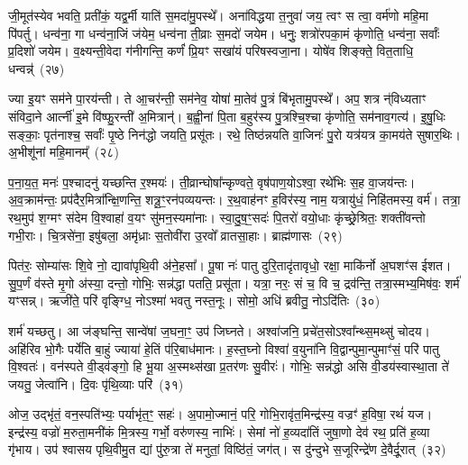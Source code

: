 {\anuvakamend[{अ॒गा॒ꣳ स॒ह॒स्रा॒क्ष॒ दे॒वाः॒ स॒हस्र॑धारा॒मत्यꣳ॑हा॒ अनु॑वर्त्मानः॒ षोड॑श च}]}%

जी॒मूत॑स्येव भवति॒ प्रती॑कं॒ यद्व॒र्मी याति॑ स॒मदा॑मु॒पस्थे᳚। अना॑विद्धया त॒नुवा॑ जय॒ त्वꣳ स त्वा॒ वर्म॑णो महि॒मा पि॑पर्तु। धन्व॑ना॒ गा धन्व॑ना॒जिं ज॑येम॒ धन्व॑ना ती॒व्राः स॒मदो॑ जयेम। धनुः॒ शत्रो॑रपका॒मं कृ॑णोति॒ धन्व॑ना॒ सर्वाः᳚ प्र॒दिशो॑ जयेम। व॒क्ष्यन्ती॒वेदा ग॑नीगन्ति॒ कर्णं॑ प्रि॒यꣳ सखा॑यं परिषस्वजा॒ना। योषे॑व शिङ्क्ते॒ वित॒ताधि॒ धन्वन्न्॑~(२७)

ज्या इ॒यꣳ सम॑ने पा॒रय॑न्ती। ते आ॒चर॑न्ती॒ सम॑नेव॒ योषा॑ मा॒तेव॑ पु॒त्रं बि॑भृतामु॒पस्थे᳚। अप॒ शत्र न्॑विध्यताꣳ संविदा॒ने आर्त्नी॑ इ॒मे वि॑ष्फु॒रन्ती॑ अ॒मित्रान्॑। ब॒ह्वी॒नां पि॒ता ब॒हुर॑स्य पु॒त्रश्चि॒श्चा कृ॑णोति॒ सम॑नाव॒गत्य॑। इ॒षु॒धिः सङ्काः॒ पृत॑नाश्च॒ सर्वाः᳚ पृ॒ष्ठे निन॑द्धो जयति॒ प्रसू॑तः। रथे॒ तिष्ठ॑न्नयति वा॒जिनः॑ पु॒रो यत्र॑यत्र का॒मय॑ते सुषार॒थिः। अ॒भीशू॑नां महि॒मानम्᳚~(२८)

प॒ना॒य॒त॒ मनः॑ प॒श्चादनु॑ यच्छन्ति र॒श्मयः॑। ती॒व्रान्घोषा᳚न्कृण्वते॒ वृष॑पाण॒यो\-ऽश्वा॒ रथे॑भिः स॒ह वा॒जय॑न्तः। अ॒व॒क्राम॑न्तः॒ प्रप॑दैर॒मित्रा᳚न्क्षि॒णन्ति॒ शत्रू॒ꣳ॒रन॑पव्ययन्तः। र॒थ॒वाह॑नꣳ ह॒विर॑स्य॒ नाम॒ यत्रायु॑धं॒ निहि॑तमस्य॒ वर्म॑। तत्रा॒ रथ॒मुप॑ श॒ग्मꣳ स॑देम वि॒श्वाहा॑ व॒यꣳ सु॑मन॒स्यमा॑नाः। स्वा॒दु॒ष॒ꣳ॒सदः॑ पि॒तरो॑ वयो॒धाः कृ॑च्छ्रे॒श्रितः॒ शक्ती॑वन्तो गभी॒राः। चि॒त्रसे॑ना॒ इषु॑बला॒ अमृ॑ध्राः स॒तोवी॑रा उ॒रवो᳚ व्रातसा॒हाः। ब्राह्म॑णासः~(२९)

पित॑रः॒ सोम्या॑सः शि॒वे नो॒ द्यावा॑पृथि॒वी अ॑ने॒हसा᳚। पू॒षा नः॑ पातु दुरि॒तादृ॑तावृधो॒ रक्षा॒ माकि॑र्नो अ॒घशꣳ॑स ईशत। सु॒प॒र्णं व॑स्ते मृ॒गो अ॑स्या॒ दन्तो॒ गोभिः॒ सन्न॑द्धा पतति॒ प्रसू॑ता। यत्रा॒ नरः॒ सं च॒ वि च॒ द्रव॑न्ति॒ तत्रा॒स्मभ्य॒मिष॑वः॒ शर्म॑ यꣳसन्न्। ऋजी॑ते॒ परि॑ वृङ्ग्धि॒ नो\-ऽश्मा॑ भवतु नस्त॒नूः। सोमो॒ अधि॑ ब्रवीतु॒ नो\-ऽदि॑तिः~(३०)

शर्म॑ यच्छतु। आ ज॑ङ्घन्ति॒ सान्वे॑षां ज॒घना॒ꣳ॒ उप॑ जिघ्नते। अश्वा॑जनि॒ प्रचे॑त॒सो\-ऽश्वा᳚न्थ्स॒मथ्सु॑ चोदय। अहि॑रिव भो॒गैः पर्ये॑ति बा॒हुं ज्याया॑ हे॒तिं प॑रि॒बाध॑मानः। ह॒स्त॒घ्नो विश्वा॑ व॒युना॑नि वि॒द्वान्पुमा॒न्पुमाꣳ॑सं॒ परि॑ पातु वि॒श्वतः॑। वन॑स्पते वी॒ड्व॑ङ्गो॒ हि भू॒या अ॒स्मथ्स॑खा प्र॒तर॑णः सु॒वीरः॑। गोभिः॒ सन्न॑द्धो असि वी॒डय॑स्वास्था॒ता ते॑ जयतु॒ जेत्वा॑नि। दि॒वः पृ॑थि॒व्याः परि॑~(३१)

ओज॒ उद्भृ॑तं॒ वन॒स्पति॑भ्यः॒ पर्याभृ॑त॒ꣳ॒ सहः॑। अ॒पामो॒ज्मानं॒ परि॒ गोभि॒रावृ॑त॒मिन्द्र॑स्य॒ वज्रꣳ॑ ह॒विषा॒ रथं॑ यज। इन्द्र॑स्य॒ वज्रो॑ म॒रुता॒मनी॑कं मि॒त्रस्य॒ गर्भो॒ वरु॑णस्य॒ नाभिः॑। सेमां नो॑ ह॒व्यदा॑तिं जुषा॒णो देव॑ रथ॒ प्रति॑ ह॒व्या गृ॑भाय। उप॑ श्वासय पृथि॒वीमु॒त द्यां पु॑रु॒त्रा ते॑ मनुतां॒ विष्ठि॑तं॒ जग॑त्। स दु॑न्दुभे स॒जूरिन्द्रे॑ण दे॒वैर्दू॒रात्~(३२)

